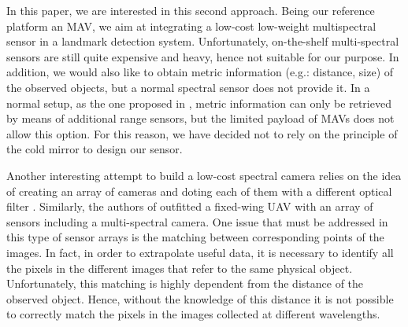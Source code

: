 \documentclass[a4paper, 10pt, conference]{ieeeconf}      %
\begin{document}
In this paper, we are interested in this second approach. %
Being our reference platform an MAV, we aim at integrating a low-cost low-weight multispectral sensor in a landmark detection system.
Unfortunately, on-the-shelf multi-spectral sensors are still quite expensive and heavy, hence not suitable for our purpose.
In addition, we would also like to obtain metric information (e.g.: distance, size) of the observed objects, but a normal spectral sensor does not provide it.
In a normal setup, as the one proposed in \cite{2007_BrUnBa}, metric information can only be retrieved by means of additional range sensors, but the limited payload of MAVs does not allow this option.
For this reason, we have decided not to rely on the principle of the cold mirror to design our sensor.

Another interesting attempt to build a low-cost spectral camera relies on the idea of creating an array of cameras and doting each of them with a different optical filter \cite{2012_DoMuHa}.
Similarly, the authors of \cite{2007_LRBLM} outfitted a fixed-wing UAV with an array of sensors including a multi-spectral camera.
One issue that must be addressed in this type of sensor arrays is the matching between corresponding points of the images.
In fact, in order to extrapolate useful data, it is necessary to identify all the pixels in the different images that refer to the same physical object.
Unfortunately, this matching is highly dependent from the distance of the observed object.
Hence, without the knowledge of this distance it is not possible to correctly match the pixels in the images collected at different wavelengths.



%
%
\end{document}
